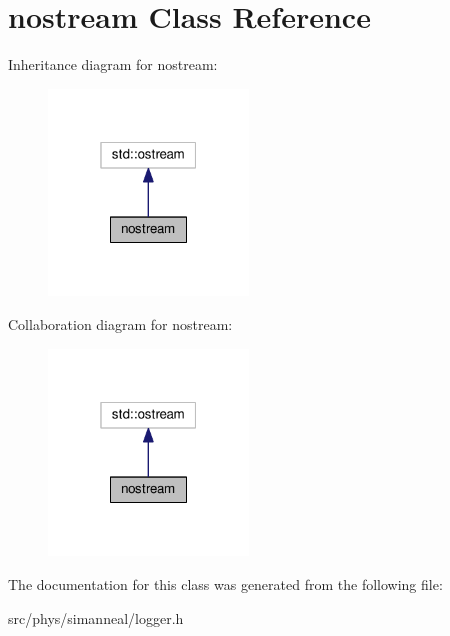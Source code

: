 \hypertarget{classnostream}{}\section{nostream Class Reference}
\label{classnostream}


Inheritance diagram for nostream\+:
\nopagebreak
\begin{figure}[H]
\begin{center}
\leavevmode
\includegraphics[width=151pt]{classnostream__inherit__graph}
\end{center}
\end{figure}


Collaboration diagram for nostream\+:
\nopagebreak
\begin{figure}[H]
\begin{center}
\leavevmode
\includegraphics[width=151pt]{classnostream__coll__graph}
\end{center}
\end{figure}


The documentation for this class was generated from the following file\+:\begin{DoxyCompactItemize}
\item 
src/phys/simanneal/logger.\+h\end{DoxyCompactItemize}
